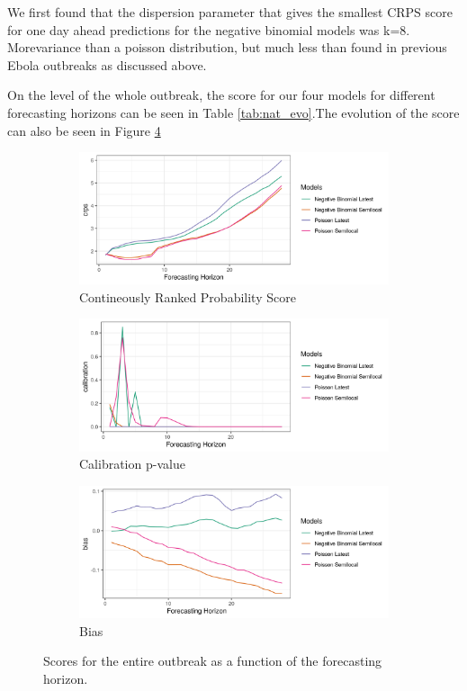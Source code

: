 \documentclass[12pt]{article}
\begin{document}
We first found that the dispersion parameter that gives the smallest CRPS score for one day ahead predictions for the negative binomial models was k=8. Morevariance than a poisson distribution, but much less than found in previous Ebola outbreaks as discussed above. 

On the level of the whole outbreak, the score for our four models for different forecasting horizons can be seen in Table \ref{tab:nat_evo}.The evolution of the score can also be seen in Figure \ref{fig:nat_scores}



\begin{figure}[h]
\begin{subfigure}{\textwidth}
  \centering
  \includegraphics[width=0.7\linewidth]{../output/crps.png}  
  \caption{Contineously Ranked Probability Score}
  \label{fig:sub-first}
\end{subfigure}

\begin{subfigure}{\textwidth}
  \centering
  \includegraphics[width=0.7\linewidth]{../output/calibration.png}  
  \caption{Calibration p-value}
  \label{fig:sub-second}
\end{subfigure}
\begin{subfigure}{\textwidth}
  \centering
  \includegraphics[width=0.7\linewidth]{../output/bias.png}  
  \caption{Bias}
  \label{fig:sub-third}
\end{subfigure}
  \caption{Scores for the entire outbreak as a function of the forecasting horizon.}

  \label{fig:nat_scores}
\end{figure}
\end{document}
